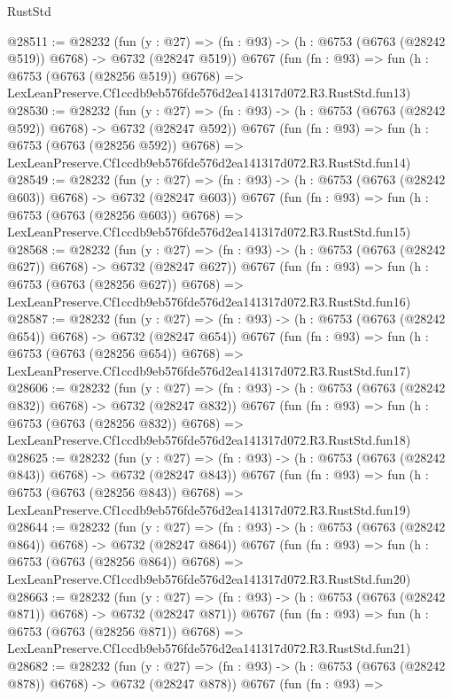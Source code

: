 \begin{lexlean}{RustStd}
\begin{coremodule}
@28511 := @28232
    (fun (y : @27) => (fn : @93) -> (h : @6753 (@6763 (@28242 @519)) @6768) -> @6732 (@28247 @519))
    @6767
    (fun (fn : @93) =>
    fun (h : @6753 (@6763 (@28256 @519)) @6768) =>
    LexLeanPreserve.Cf1ccdb9eb576fde576d2ea141317d072.R3.RustStd.fun13)
@28530 := @28232
    (fun (y : @27) => (fn : @93) -> (h : @6753 (@6763 (@28242 @592)) @6768) -> @6732 (@28247 @592))
    @6767
    (fun (fn : @93) =>
    fun (h : @6753 (@6763 (@28256 @592)) @6768) =>
    LexLeanPreserve.Cf1ccdb9eb576fde576d2ea141317d072.R3.RustStd.fun14)
@28549 := @28232
    (fun (y : @27) => (fn : @93) -> (h : @6753 (@6763 (@28242 @603)) @6768) -> @6732 (@28247 @603))
    @6767
    (fun (fn : @93) =>
    fun (h : @6753 (@6763 (@28256 @603)) @6768) =>
    LexLeanPreserve.Cf1ccdb9eb576fde576d2ea141317d072.R3.RustStd.fun15)
@28568 := @28232
    (fun (y : @27) => (fn : @93) -> (h : @6753 (@6763 (@28242 @627)) @6768) -> @6732 (@28247 @627))
    @6767
    (fun (fn : @93) =>
    fun (h : @6753 (@6763 (@28256 @627)) @6768) =>
    LexLeanPreserve.Cf1ccdb9eb576fde576d2ea141317d072.R3.RustStd.fun16)
@28587 := @28232
    (fun (y : @27) => (fn : @93) -> (h : @6753 (@6763 (@28242 @654)) @6768) -> @6732 (@28247 @654))
    @6767
    (fun (fn : @93) =>
    fun (h : @6753 (@6763 (@28256 @654)) @6768) =>
    LexLeanPreserve.Cf1ccdb9eb576fde576d2ea141317d072.R3.RustStd.fun17)
@28606 := @28232
    (fun (y : @27) => (fn : @93) -> (h : @6753 (@6763 (@28242 @832)) @6768) -> @6732 (@28247 @832))
    @6767
    (fun (fn : @93) =>
    fun (h : @6753 (@6763 (@28256 @832)) @6768) =>
    LexLeanPreserve.Cf1ccdb9eb576fde576d2ea141317d072.R3.RustStd.fun18)
@28625 := @28232
    (fun (y : @27) => (fn : @93) -> (h : @6753 (@6763 (@28242 @843)) @6768) -> @6732 (@28247 @843))
    @6767
    (fun (fn : @93) =>
    fun (h : @6753 (@6763 (@28256 @843)) @6768) =>
    LexLeanPreserve.Cf1ccdb9eb576fde576d2ea141317d072.R3.RustStd.fun19)
@28644 := @28232
    (fun (y : @27) => (fn : @93) -> (h : @6753 (@6763 (@28242 @864)) @6768) -> @6732 (@28247 @864))
    @6767
    (fun (fn : @93) =>
    fun (h : @6753 (@6763 (@28256 @864)) @6768) =>
    LexLeanPreserve.Cf1ccdb9eb576fde576d2ea141317d072.R3.RustStd.fun20)
@28663 := @28232
    (fun (y : @27) => (fn : @93) -> (h : @6753 (@6763 (@28242 @871)) @6768) -> @6732 (@28247 @871))
    @6767
    (fun (fn : @93) =>
    fun (h : @6753 (@6763 (@28256 @871)) @6768) =>
    LexLeanPreserve.Cf1ccdb9eb576fde576d2ea141317d072.R3.RustStd.fun21)
@28682 := @28232
    (fun (y : @27) => (fn : @93) -> (h : @6753 (@6763 (@28242 @878)) @6768) -> @6732 (@28247 @878))
    @6767
    (fun (fn : @93) =>

\end{coremodule}
\end{lexlean}
